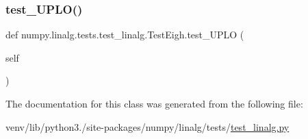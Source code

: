 \subsubsection{\texorpdfstring{test\+\_\+\+U\+P\+L\+O()}{test\_UPLO()}}
{\footnotesize\ttfamily def numpy.\+linalg.\+tests.\+test\+\_\+linalg.\+Test\+Eigh.\+test\+\_\+\+U\+P\+LO (\begin{DoxyParamCaption}\item[{}]{self }\end{DoxyParamCaption})}



The documentation for this class was generated from the following file\+:\begin{DoxyCompactItemize}
\item 
venv/lib/python3./site-\/packages/numpy/linalg/tests/\hyperlink{test__linalg_8py}{test\+\_\+linalg.\+py}\end{DoxyCompactItemize}
